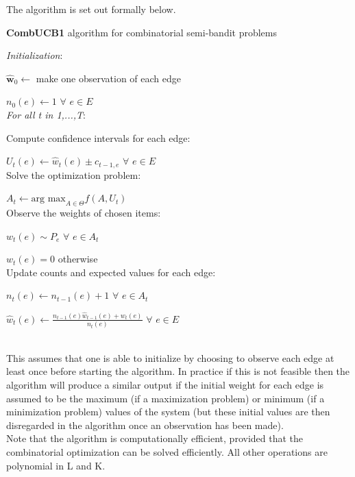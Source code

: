 The algorithm is set out formally below.

\noindent \hrulefill

\noindent \textbf{CombUCB1} algorithm for combinatorial semi-bandit problems

\noindent \hrulefill

\noindent \textit{Initialization}:

$\mathbf{\hat{w}}_0 \leftarrow$ make one observation of each edge

$n_0(e) \leftarrow 1$ $\forall$ $e \in E$\\

\noindent \textit{For all t in 1,...,T}:

Compute confidence intervals for each edge:

\indent \indent $U_t(e) \leftarrow \hat{w}_t(e)\pm c_{t-1,e}$ $\forall$ $e \in E$\\

Solve the optimization problem:

\indent \indent $A_t \leftarrow \textrm{arg max}_{A\in \Theta}f(A,U_t)$\\

Observe the weights of chosen items:

\indent \indent $w_t(e) \sim P_e$ $\forall$ $e \in A_t$

\indent \indent $w_t(e)=0$ otherwise\\

Update counts and expected values for each edge:

\indent \indent $n_t(e) \leftarrow n_{t-1}(e) + 1$ $\forall$ $e \in A_t$

\indent \indent $\hat{w}_t(e) \leftarrow \frac{n_{t-1}(e)\hat{w}_{t-1}(e)+w_t(e)}{n_t(e)}$ $\forall$ $e \in E$

\noindent \hrulefill\\

This assumes that one is able to initialize by choosing to observe each edge at least once before starting the algorithm. In practice if this is not feasible then the algorithm will produce a similar output if the initial weight for each edge is assumed to be the maximum (if a maximization problem) or minimum (if a minimization problem) values of the system (but these initial values are then disregarded in the algorithm once an observation has been made).\\

Note that the algorithm is computationally efficient, provided that the combinatorial optimization can be solved efficiently. All other operations are polynomial in L and K.\\



